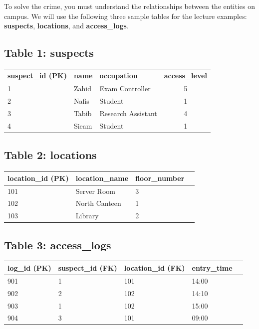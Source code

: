 \documentclass[12pt,a4paper]{article}
\begin{document}
\noindent To solve the crime, you must understand the relationships between the entities on campus. We will use the following three sample tables for the lecture examples: \textbf{suspects}, \textbf{locations}, and \textbf{access\_logs}.

\subsection*{Table 1: suspects}
\begin{table}[H]
\centering
\begin{tabular}{@{}lllc@{}}
\toprule
\textbf{suspect\_id} (PK) & \textbf{name} & \textbf{occupation} & \textbf{access\_level} \\ \midrule
1 & Zahid & Exam Controller & 5 \\
2 & Nafis & Student & 1 \\
3 & Tabib & Research Assistant & 4 \\
4 & Sieam & Student & 1 \\ \bottomrule
\end{tabular}
\end{table}

\subsection*{Table 2: locations}
\begin{table}[H]
\centering
\begin{tabular}{@{}lllc@{}}
\toprule
\textbf{location\_id} (PK) & \textbf{location\_name} & \textbf{floor\_number} \\ \midrule
101 & Server Room & 3 \\
102 & North Canteen & 1 \\
103 & Library & 2 \\ \bottomrule
\end{tabular}
\end{table}

\subsection*{Table 3: access\_logs}
\begin{table}[H]
\centering
\begin{tabular}{@{}llllc@{}}
\toprule
\textbf{log\_id} (PK) & \textbf{suspect\_id} (FK) & \textbf{location\_id} (FK) & \textbf{entry\_time} \\ \midrule
901 & 1 & 101 & 14:00 \\
902 & 2 & 102 & 14:10 \\
903 & 1 & 102 & 15:00 \\
904 & 3 & 101 & 09:00 \\ \bottomrule
\end{tabular}
\end{table}
\end{document}
